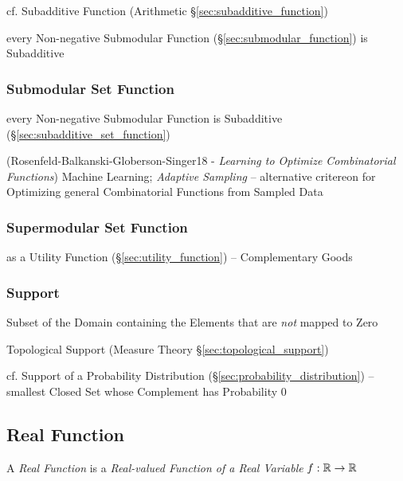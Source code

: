 cf. Subadditive Function (Arithmetic \S\ref{sec:subadditive_function})

every Non-negative Submodular Function (\S\ref{sec:submodular_function}) is
Subadditive



\subsubsection{Submodular Set Function}\label{sec:submodular_set_function}

every Non-negative Submodular Function is Subadditive
(\S\ref{sec:subadditive_set_function})

(Rosenfeld-Balkanski-Globerson-Singer18 - \emph{Learning to Optimize
  Combinatorial Functions}) Machine Learning; \emph{Adaptive Sampling} --
alternative critereon for Optimizing general Combinatorial Functions from
Sampled Data



\subsubsection{Supermodular Set Function}\label{sec:submodular_set_function}

as a Utility Function (\S\ref{sec:utility_function}) -- Complementary Goods



\subsubsection{Support}\label{sec:support}

Subset of the Domain containing the Elements that are \emph{not} mapped to Zero

Topological Support (Measure Theory \S\ref{sec:topological_support})

cf. Support of a Probability Distribution (\S\ref{sec:probability_distribution})
-- smallest Closed Set whose Complement has Probability $0$



\subsection{Real Function}\label{sec:real_function}

A \emph{Real Function} is a \emph{Real-valued Function of a Real Variable}
$f : \mathbb{R} \rightarrow \mathbb{R}$

